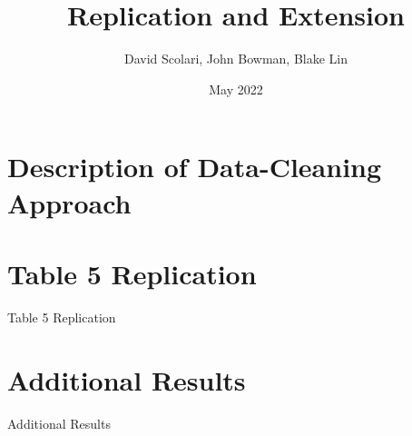 \documentclass{article}
\author{David Scolari, John Bowman, Blake Lin}
\title{Replication and Extension}
\date{May 2022}
\begin{document}
\maketitle
\section*{Description of Data-Cleaning Approach}

\section*{Table 5 Replication}
\begin{table}[htbp]
   \centering
   \caption{Table 5 Replication}
  
   \label{tab:booktabs}
\end{table}






\section*{Additional Results}

\begin{table}[htbp]
   \centering
   \caption{Additional Results}
  
   \label{tab:booktabs}
\end{table}
\end{document}
